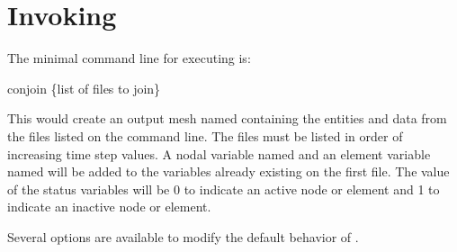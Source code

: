 \section{Invoking \conjoin}
The minimal command line for executing \conjoin{} is:
\begin{syntax}
     conjoin \{list of files to join\}
\end{syntax}
This would create an output mesh named  containing
the entities and data from the files listed on the command line.  The
files must be listed in order of increasing time step values.  A nodal
variable named  and an element variable named
 will be added to the variables already existing
on the first file.  The value of the status variables will be 0 to
indicate an active node or element and 1 to indicate an inactive node
or element. 

Several options are available to modify the default behavior of \conjoin{}.

